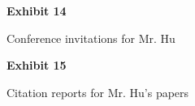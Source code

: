 \documentclass{article}
\begin{document}
% 

% 

% 

% 

% 


\vspace*{\fill}
\begin{center}

{\LARGE \bf
Exhibit 14
}

\vspace{10\baselineskip}

{\large Conference invitations for Mr. Hu}

\end{center}
\vspace*{\fill}

% 

% 

% 

% 

% 


\vspace*{\fill}
\begin{center}

{\LARGE \bf
Exhibit 15
}

\vspace{10\baselineskip}

{\large Citation reports for Mr. Hu’s papers}

\end{center}
\vspace*{\fill}

% 
\end{document}
